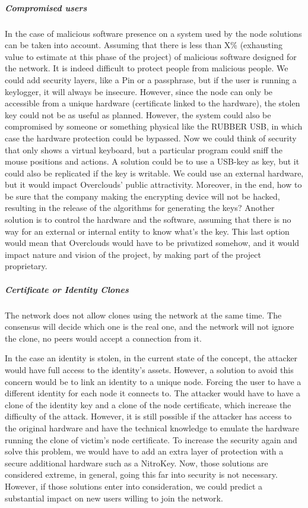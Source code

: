 \subparagraph{Compromised users} In the case of malicious software presence on a system used by the node solutions can be taken into account. Assuming that there is less than X\% (exhausting value to estimate at this phase of the project) of malicious software designed for the network. It is indeed difficult to protect people from malicious people. We could add security layers, like a Pin or a passphrase, but if the user is running a keylogger, it will always be insecure. However, since the node can only be accessible from a unique hardware (certificate linked to the hardware), the stolen key could not be as useful as planned. However, the system could also be compromised by someone or something physical like the RUBBER USB\cite{HakshopRubberUSB}, in which case the hardware protection could be bypassed. Now we could think of security that only shows a virtual keyboard, but a particular program could sniff the mouse positions and actions. A solution could be to use a USB-key as key, but it could also be replicated if the key is writable. We could use an external hardware, but it would impact Overclouds' public attractivity. Moreover, in the end, how to be sure that the company making the encrypting device will not be hacked, resulting in the release of the algorithms for generating the keys? Another solution is to control the hardware and the software, assuming that there is no way for an external or internal entity to know what's the key. This last option would mean that Overclouds would have to be privatized somehow, and it would impact nature and vision of the project, by making part of the project proprietary.

\subparagraph{Certificate or Identity Clones} The network does not allow clones using the network at the same time. The consensus will decide which one is the real one, and the network will not ignore the clone, no peers would accept a connection from it.

In the case an identity is stolen, in the current state of the concept, the attacker would have full access to the identity's assets. However, a solution to avoid this concern would be to link an identity to a unique node. Forcing the user to have a different identity for each node it connects to. The attacker would have to have a clone of the identity key and a clone of the node certificate, which increase the difficulty of the attack. However, it is still possible if the attacker has access to the original hardware and have the technical knowledge to emulate the hardware running the clone of victim's node certificate. To increase the security again and solve this problem, we would have to add an extra layer of protection with a secure additional hardware such as a NitroKey\cite{NitrokeyNitokey}. Now, those solutions are considered extreme, in general, going this far into security is not necessary.  However, if those solutions enter into consideration, we could predict a substantial impact on new users willing to join the network.

